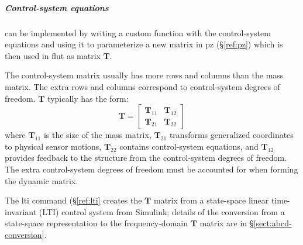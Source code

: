 \documentclass[11pt,openany,twoside]{book}
\numberwithin{equation}{section}		%
\newcommand{\Cmd}[1]{{\sf #1}}
\newcommand{\Matrix}[1]{\boldsymbol{#1}}
\newcommand{\Vector}[1]{\boldsymbol{#1}}
\newcommand{\Sectref}[1]{\S\ref{#1}}
\begin{document}
\subparagraph{Control-system equations}
can be implemented by writing a custom function
with the control-system equations
and using it to parameterize a new matrix in
\Cmd{pz} (\Sectref{ref:pz}) which is then used in \Cmd{flut} as matrix $\Matrix{T}$.

The control-system matrix usually has more rows and columns than the
mass matrix. The extra rows and columns correspond to control-system
degrees of freedom. $\Matrix{T}$ typically has the form:
\begin{equation}
\Matrix{T} = \left[ \begin{array}{cc}
			\Matrix{T}_{11}     &   \Matrix{T}_{12} \\
	      \Matrix{T}_{21}     &   \Matrix{T}_{22}
		\end{array} \right]
\end{equation}
where $\Matrix{T}_{11}$ is the size of the mass matrix,
$\Matrix{T}_{21}$ transforms generalized coordinates to physical sensor motions,
$\Matrix{T}_{22}$ contains control-system equations, and $\Matrix{T}_{12}$ provides
feedback to the structure from the control-system degrees of freedom.
The extra control-system degrees of freedom must be accounted for when
forming the dynamic matrix.
\par
The \Cmd{lti} command (\Sectref{ref:lti} creates the $\Matrix{T}$ matrix
from a state-space linear time-invariant (LTI) control system from Simulink;
details of the conversion from a state-space
representation to the frequency-domain $\Matrix{T}$ matrix are in
\Sectref{sect:abcd-conversion}.
\end{document}
